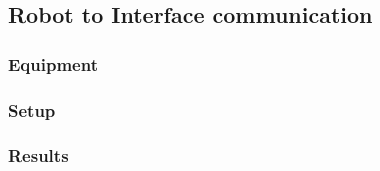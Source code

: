 \subsection{Robot to Interface communication}

\subsubsection{Equipment}

\subsubsection{Setup}
 
\subsubsection{Results}